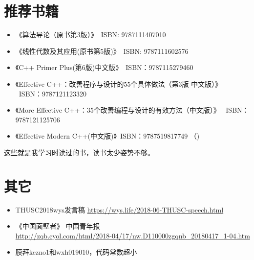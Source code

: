 \section{推荐书籍}
\begin{itemize}
    \item 《算法导论（原书第3版）》~ISBN: 9787111407010
    \item 《线性代数及其应用(原书第5版)》~ISBN: 9787111602576
    \item 《C++ Primer Plus(第6版)中文版》~ISBN：9787115279460
    \item 《Effective C++：改善程序与设计的55个具体做法（第3版 中文版）》
    ~ISBN：9787121123320
    \item 《More Effective C++：35个改善编程与设计的有效方法（中文版）》
    ~ISBN：9787121125706
    \item 《Effective Modern C++(中文版)》~ISBN：9787519817749
    （)
\end{itemize}

这些就是我学习时读过的书，读书太少姿势不够。
\section{其它}
\begin{itemize}
    \item THUSC2018wys发言稿 \url{https://wys.life/2018-06-THUSC-speech.html}
    \item 《中国面壁者》 中国青年报\\
    {\footnotesize \url{http://zqb.cyol.com/html/2018-04/17/nw.D110000zgqnb\_20180417\_1-04.htm}}
    \item 膜拜kczno1和wxh019010，代码常数超小
\end{itemize}

